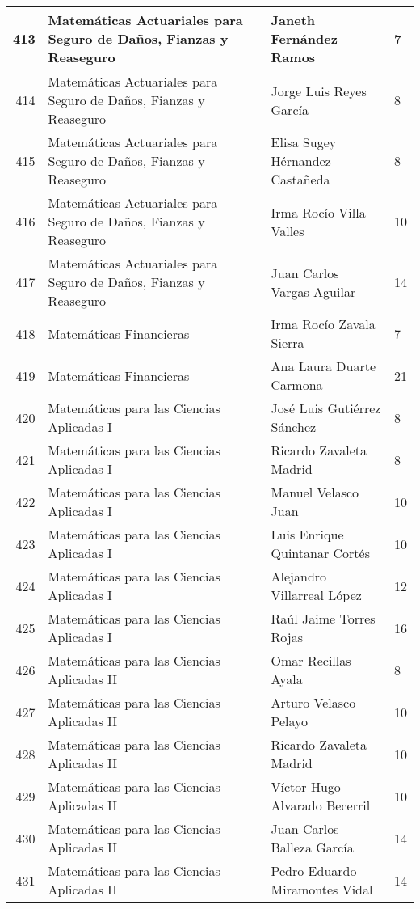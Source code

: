 \begin{table}[ht]
\begin{tabular}{rlll}
  413 & Matemáticas Actuariales para Seguro de Daños, Fianzas y Reaseguro & Janeth Fernández Ramos & 7 \\ \hline
  414 & Matemáticas Actuariales para Seguro de Daños, Fianzas y Reaseguro & Jorge Luis Reyes García & 8 \\ \hline
  415 & Matemáticas Actuariales para Seguro de Daños, Fianzas y Reaseguro & Elisa Sugey Hérnandez Castañeda & 8 \\ \hline
  416 & Matemáticas Actuariales para Seguro de Daños, Fianzas y Reaseguro & Irma Rocío Villa Valles & 10 \\ \hline
  417 & Matemáticas Actuariales para Seguro de Daños, Fianzas y Reaseguro & Juan Carlos Vargas Aguilar & 14 \\ \hline
  418 & Matemáticas Financieras & Irma Rocío Zavala Sierra & 7 \\ \hline
  419 & Matemáticas Financieras & Ana Laura Duarte Carmona & 21 \\ \hline
  420 & Matemáticas para las Ciencias Aplicadas I & José Luis Gutiérrez Sánchez & 8 \\ \hline
  421 & Matemáticas para las Ciencias Aplicadas I & Ricardo Zavaleta Madrid & 8 \\ \hline
  422 & Matemáticas para las Ciencias Aplicadas I & Manuel Velasco Juan & 10 \\ \hline
  423 & Matemáticas para las Ciencias Aplicadas I & Luis Enrique Quintanar Cortés & 10 \\ \hline
  424 & Matemáticas para las Ciencias Aplicadas I & Alejandro Villarreal López & 12 \\ \hline
  425 & Matemáticas para las Ciencias Aplicadas I & Raúl Jaime Torres Rojas & 16 \\ \hline
  426 & Matemáticas para las Ciencias Aplicadas II & Omar Recillas Ayala & 8 \\ \hline
  427 & Matemáticas para las Ciencias Aplicadas II & Arturo Velasco Pelayo & 10 \\ \hline
  428 & Matemáticas para las Ciencias Aplicadas II & Ricardo Zavaleta Madrid & 10 \\ \hline
  429 & Matemáticas para las Ciencias Aplicadas II & Víctor Hugo Alvarado Becerril & 10 \\ \hline
  430 & Matemáticas para las Ciencias Aplicadas II & Juan Carlos Balleza García & 14 \\ \hline
  431 & Matemáticas para las Ciencias Aplicadas II & Pedro Eduardo Miramontes Vidal & 14 \\ \hline

\end{tabular}
\end{table}
